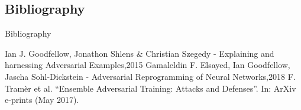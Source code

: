 \documentclass{beamer}
\begin{document}
\begin{darkframes}
    

    \section{Bibliography}

    \begin{frame}[label=bibliography]{Bibliography}
      \begin{thebibliography}{9}
            Ian J. Goodfellow, Jonathon Shlens & Christian Szegedy - Explaining and harnessing Adversarial Examples,2015
            Gamaleldin F. Elsayed, Ian Goodfellow, Jascha Sohl-Dickstein - Adversarial Reprogramming of Neural Networks,2018
           F. Tramèr et al. “Ensemble Adversarial Training: Attacks and Defenses”. In: ArXiv e-prints
(May 2017).
        
      \end{thebibliography}
    \end{frame}

  \end{darkframes}
\end{document}
